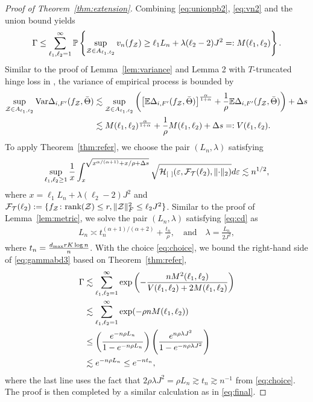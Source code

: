 \documentclass[twoside,11pt]{article}
\theoremstyle{definition}
\begin{document}
\begin{proof}[Proof of Theorem~\ref{thm:extension}]
Combining \eqref{eq:unionpb2},  \eqref{eq:vn2} and the union bound yields
\begin{align}\label{eq:gammabd3}
\Gamma\leq \sum_{\ell_1,\ell_2=1}^\infty\mathbb{P}\left\{\sup_{\mathcal{Z}\in A_{\ell_1,\ell_2}} v_n(f_{\mathcal{Z}})\geq  \ell_1 L_n+\lambda(\ell_2-2)J^2=:M(\ell_1,\ell_2) \right\}.
\end{align}
Similar to the proof of Lemma~\ref{lem:variance} and Lemma 2 with $T$-truncated hinge loss in \cite{lee2021nonparametric}, the variance of empirical process is bounded by 
\begin{align}
\sup_{\mathcal{Z}\in A_{\ell_1,\ell_2}}\textup{Var}\Delta_{i,F'}(f_{\mathcal{Z}},\bar \Theta)& \lesssim \sup_{\mathcal{Z}\in A_{\ell_1,\ell_2}}\left( \left[\mathbb{E}\Delta_{i,F'}(f_{\mathcal{Z}},\bar \Theta)\right]^{\alpha \over 1+\alpha}+{1\over \rho}\mathbb{E}\Delta_{i,F'}(f_{\mathcal{Z}},\bar \Theta)\right)+\Delta s \\&\lesssim M(\ell_1,\ell_2)^{\alpha\over 1+\alpha}+\frac{1}{\rho}M(\ell_1,\ell_2) +\Delta s =: V(\ell_1,\ell_2).
\end{align}
To apply Theorem~\ref{thm:refer}, we choose the pair $(L_n,\lambda)$ satisfying
\begin{align}\label{eq:cd}
\sup_{\ell_1,\ell_2\geq 1}{1\over x}\int_{x}^{\sqrt{x^{\alpha/(\alpha+1)}+x/\rho+\Delta s}}\sqrt{\tH_{[\ ]}(\varepsilon, \tF_{\tT}(\ell_2),\vnormSize{}{\cdot})}d\varepsilon \lesssim n^{1/2}, 
\end{align}
where $x=\ell_1 L_n+\lambda(\ell_2-2)J^2$ and $\mathcal{F}_{\mathcal{T}}(\ell_2):= \{f_{\mathcal{Z}}\colon \text{rank}(\mathcal{Z})\leq r, \lVert\mathcal{Z}\rVert_F^2\leq \ell_2J^2\}$.
Similar to the proof of Lemma~\ref{lem:metric}, we solve the pair $(L_n,\lambda)$ satisfying \eqref{eq:cd} as
\begin{align}\label{eq:choice}
L_n\asymp t_n^{(\alpha+1)/(\alpha+2)}+\frac{t_n}{\rho},\quad\text{and}\quad\lambda =  \frac{L_n}{2J^2},
\end{align}where $ t_n={d_{\max}rK\log n \over n}$.
With the choice \eqref{eq:choice}, we bound the right-hand side of \eqref{eq:gammabd3} based on Theorem~\ref{thm:refer}, 
\begin{align}\label{eq:gammabd4}
\Gamma&\lesssim \sum_{\ell_1,\ell_2=1}^\infty \exp\left(-\frac{nM^2(\ell_1,\ell_2)}{V(\ell_1,\ell_2)+2M(\ell_1,\ell_2)}\right)\\&\lesssim \sum_{\ell_1,\ell_2=1}^\infty	\exp(-\rho  n M(\ell_1,\ell_2))\\&\leq \left(e^{-n\rho L_n}\over 1-e^{-n\rho L_n}\right)\left(e^{n\rho \lambda J^2}\over 1-e^{-n\rho \lambda J^2}\right)\\&\lesssim e^{-n\rho L_n}\leq e^{-nt_n},
\end{align}
where the last line uses the fact that $2\rho\lambda J^2= \rho L_n\gtrsim t_n\gtrsim n^{-1}$ from \eqref{eq:choice}. The proof is then completed by a similar calculation as in \eqref{eq:final}.
\end{proof}
\end{document}
